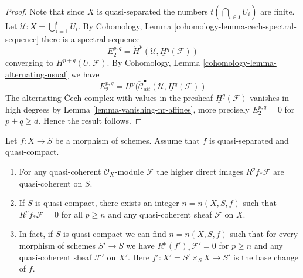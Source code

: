 \begin{proof}
Note that since $X$ is quasi-separated the numbers
$t(\bigcap_{i \in I} U_i)$ are finite.
Let $\mathcal{U} : X = \bigcup_{i = 1}^t U_i$.
By
Cohomology, Lemma \ref{cohomology-lemma-cech-spectral-sequence}
there is a spectral sequence
$$
E_2^{p, q} = \check{H}^p(\mathcal{U}, \underline{H}^q(\mathcal{F}))
$$
converging to $H^{p + q}(U, \mathcal{F})$. By
Cohomology, Lemma \ref{cohomology-lemma-alternating-usual}
we have
$$
E_2^{p, q} =
H^p(\check{\mathcal{C}}_{alt}^\bullet(
\mathcal{U}, \underline{H}^q(\mathcal{F}))
$$
The alternating {\v C}ech complex with values in the presheaf
$\underline{H}^q(\mathcal{F})$ vanishes in high degrees by
Lemma \ref{lemma-vanishing-nr-affines},
more precisely $E_2^{p, q} = 0$ for $p + q \geq d$.
Hence the result follows.
\end{proof}

\begin{lemma}
\label{lemma-quasi-coherence-higher-direct-images}
Let $f : X \to S$ be a morphism of schemes.
Assume that $f$ is quasi-separated and quasi-compact.
\begin{enumerate}
\item For any quasi-coherent $\mathcal{O}_X$-module $\mathcal{F}$ the
higher direct images $R^pf_*\mathcal{F}$ are quasi-coherent on $S$.
\item If $S$ is quasi-compact, there exists an integer $n = n(X, S, f)$
such that $R^pf_*\mathcal{F} = 0$ for all $p \geq n$ and any
quasi-coherent sheaf $\mathcal{F}$ on $X$.
\item In fact, if $S$ is quasi-compact we can find $n = n(X, S, f)$
such that for every
morphism of schemes $S' \to S$ we have $R^p(f')_*\mathcal{F}' = 0$
for $p \geq n$ and any quasi-coherent sheaf $\mathcal{F}'$
on $X'$. Here $f' : X' = S' \times_S X \to S'$ is the base change of $f$.
\end{enumerate}
\end{lemma}

